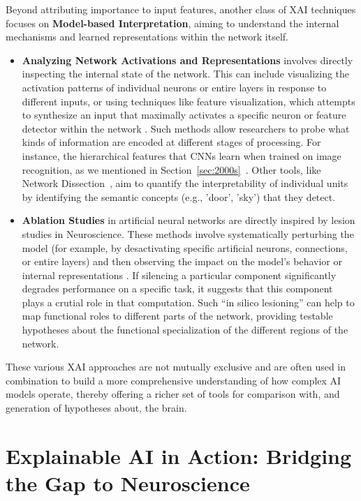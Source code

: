 Beyond attributing importance to input features, another class of XAI techniques focuses on \textbf{Model-based Interpretation}, aiming to understand the internal mechanisms and learned representations within the network itself.
\begin{itemize}
    \item \textbf{Analyzing Network Activations and Representations} involves directly inspecting the internal state of the network. This can include visualizing the activation patterns of individual neurons or entire layers in response to different inputs, or using techniques like feature visualization, which attempts to synthesize an input that maximally activates a specific neuron or feature detector within the network \cite{olah2018building}. Such methods allow researchers to probe what kinds of information are encoded at different stages of processing. For instance, the hierarchical features that CNNs learn when trained on image recognition, as we mentioned in Section~\ref{sec:2000s}~\cite{yamins2016using}. Other tools, like Network Dissection~\cite{bau2017network}, aim to quantify the interpretability of individual units by identifying the semantic concepts (e.g., 'door', 'sky') that they detect.

    \item \textbf{Ablation Studies} in artificial neural networks are directly inspired by lesion studies in Neuroscience. These methods involve systematically perturbing the model (for example, by desactivating specific artificial neurons, connections, or entire layers) and then observing the impact on the model's behavior or internal representations \cite{kriegeskorte2018cognitive}. If silencing a particular component significantly degrades performance on a specific task, it suggests that this component plays a crutial role in that computation. Such ``in silico lesioning'' can help to map functional roles to different parts of the network, providing testable hypotheses about the functional specialization of the different regions of the network.
\end{itemize}
These various XAI approaches are not mutually exclusive and are often used in combination to build a more comprehensive understanding of how complex AI models operate, thereby offering a richer set of tools for comparison with, and generation of hypotheses about, the brain.

\section{Explainable AI in Action: Bridging the Gap to Neuroscience}

